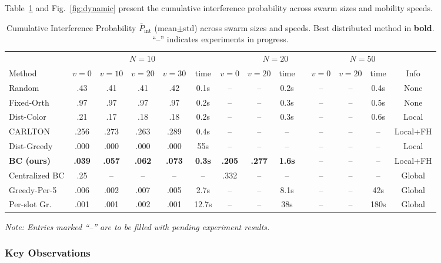 \documentclass[journal]{IEEEtran}
\begin{document}
Table~\ref{tab:main_results} and Fig.~\ref{fig:dynamic} present the cumulative interference probability across swarm sizes and mobility speeds.

\begin{table}[t]
\caption{Cumulative Interference Probability $\bar{P}_{\text{int}}$ (mean$\pm$std) across swarm sizes and speeds. Best distributed method in \textbf{bold}. ``--'' indicates experiments in progress.}
\label{tab:main_results}
\centering
\small
\begin{tabular}{l|cccc|c|cccc|c|cc|c}
\toprule
& \multicolumn{5}{c|}{$N=10$} & \multicolumn{5}{c|}{$N=20$} & \multicolumn{2}{c|}{$N=50$} & \\
Method & $v\!=\!0$ & $v\!=\!10$ & $v\!=\!20$ & $v\!=\!30$ & time & $v\!=\!0$ & $v\!=\!20$ & time & & $v\!=\!0$ & $v\!=\!20$ & time & Info \\
\midrule
Random & .43 & .41 & .41 & .42 & 0.1s & -- & -- & 0.2s & & -- & -- & 0.4s & None \\
Fixed-Orth & .97 & .97 & .97 & .97 & 0.2s & -- & -- & 0.3s & & -- & -- & 0.5s & None \\
Dist-Color & .21 & .17 & .18 & .18 & 0.2s & -- & -- & 0.3s & & -- & -- & 0.6s & Local \\
CARLTON & .256 & .273 & .263 & .289 & 0.4s & -- & -- & -- & & -- & -- & -- & Local+FH \\
Dist-Greedy & .000 & .000 & .000 & .000 & 55s & -- & -- & -- & & -- & -- & -- & Local \\
\textbf{BC (ours)} & \textbf{.039} & \textbf{.057} & \textbf{.062} & \textbf{.073} & \textbf{0.3s} & \textbf{.205} & \textbf{.277} & \textbf{1.6s} & & -- & -- & -- & Local+FH \\
\midrule
Centralized BC & .25 & -- & -- & -- & -- & .332 & -- & -- & & -- & -- & -- & Global \\
Greedy-Per-5 & .006 & .002 & .007 & .005 & 2.7s & -- & -- & 8.1s & & -- & -- & 42s & Global \\
Per-slot Gr. & .001 & .001 & .002 & .001 & 12.7s & -- & -- & 38s & & -- & -- & 180s & Global \\
\bottomrule
\end{tabular}
\end{table}

\textit{Note: Entries marked ``--'' are to be filled with pending experiment results.}

\subsubsection{Key Observations}
\end{document}
